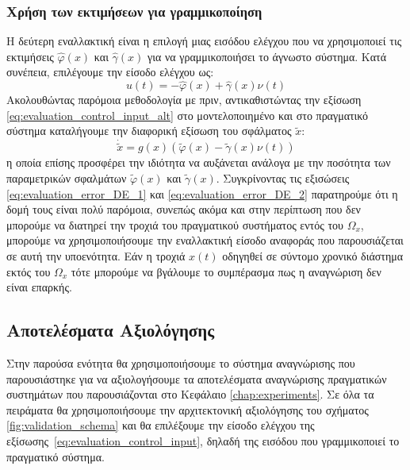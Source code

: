 \subsubsection{Χρήση των εκτιμήσεων για γραμμικοποίηση}
Η δεύτερη εναλλακτική είναι η επιλογή μιας εισόδου ελέγχου που να χρησιμοποιεί τις εκτιμήσεις $\hat{\varphi}(x)$ και $\hat{\gamma}(x)$ για να γραμμικοποιήσει το άγνωστο σύστημα. Κατά συνέπεια, επιλέγουμε την είσοδο ελέγχου ως:
\begin{equation}
	u(t) = -\hat{\varphi}(x) + \hat{\gamma}(x) \nu(t)
	\label{eq:evaluation_control_input_alt}
\end{equation}
Ακολουθώντας παρόμοια μεθοδολογία με πριν, αντικαθιστώντας την εξίσωση \ref{eq:evaluation_control_input_alt} στο μοντελοποιημένο και στο πραγματικό σύστημα καταλήγουμε την διαφορική εξίσωση του σφάλματος $\tilde{x}$:
\begin{equation}
	\dot{\tilde{x}} = g(x) \left( \tilde{\varphi}(x)  -\tilde{\gamma}(x) \nu(t) \right)
	\label{eq:evaluation_error_DE_2}
\end{equation}
η οποία επίσης προσφέρει την ιδιότητα να αυξάνεται ανάλογα με την ποσότητα των παραμετρικών σφαλμάτων $\tilde{\varphi}(x)$ και $\tilde{\gamma}(x)$. Συγκρίνοντας τις εξισώσεις \ref{eq:evaluation_error_DE_1} και \ref{eq:evaluation_error_DE_2} παρατηρούμε ότι η δομή τους είναι πολύ παρόμοια, συνεπώς ακόμα και στην περίπτωση που δεν μπορούμε να διατηρεί την τροχιά του πραγματικού συστήματος εντός του $\Omega_x$, μπορούμε να χρησιμοποιήσουμε την εναλλακτική είσοδο αναφοράς που παρουσιάζεται σε αυτή την υποενότητα. Εάν η τροχιά $x(t)$ οδηγηθεί σε σύντομο χρονικό διάστημα εκτός του $\Omega_x$ τότε μπορούμε να βγάλουμε το συμπέρασμα πως η αναγνώριση δεν είναι επαρκής.


\subsection{Αποτελέσματα Αξιολόγησης}
Στην παρούσα ενότητα θα χρησιμοποιήσουμε το σύστημα αναγνώρισης που παρουσιάστηκε για να αξιολογήσουμε τα αποτελέσματα αναγνώρισης πραγματικών συστημάτων που παρουσιάζονται στο Κεφάλαιο \ref{chap:experiments}. Σε όλα τα πειράματα θα χρησιμοποιήσουμε την αρχιτεκτονική αξιολόγησης του σχήματος \ref{fig:validation_schema} και θα επιλέξουμε την είσοδο ελέγχου της εξίσωσης~\eqref{eq:evaluation_control_input}, δηλαδή της εισόδου που γραμμικοποιεί το πραγματικό σύστημα.

